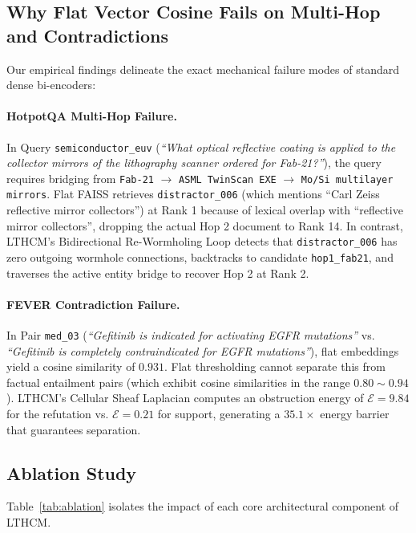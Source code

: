 \documentclass[11pt,a4paper]{article}
\begin{document}
\subsection{Why Flat Vector Cosine Fails on Multi-Hop and Contradictions}

Our empirical findings delineate the exact mechanical failure modes of standard dense bi-encoders:

\paragraph{HotpotQA Multi-Hop Failure.} In Query \texttt{semiconductor\_euv} (\emph{``What optical reflective coating is applied to the collector mirrors of the lithography scanner ordered for Fab-21?''}), the query requires bridging from \texttt{Fab-21} $\to$ \texttt{ASML TwinScan EXE} $\to$ \texttt{Mo/Si multilayer mirrors}. Flat FAISS retrieves \texttt{distractor\_006} (which mentions ``Carl Zeiss reflective mirror collectors'') at Rank 1 because of lexical overlap with ``reflective mirror collectors'', dropping the actual Hop 2 document to Rank 14. In contrast, LTHCM's Bidirectional Re-Wormholing Loop detects that \texttt{distractor\_006} has zero outgoing wormhole connections, backtracks to candidate \texttt{hop1\_fab21}, and traverses the active entity bridge to recover Hop 2 at Rank 2.

\paragraph{FEVER Contradiction Failure.} In Pair \texttt{med\_03} (\emph{``Gefitinib is indicated for activating EGFR mutations''} vs. \emph{``Gefitinib is completely contraindicated for EGFR mutations''}), flat embeddings yield a cosine similarity of $0.931$. Flat thresholding cannot separate this from factual entailment pairs (which exhibit cosine similarities in the range $0.80 \sim 0.94$). LTHCM's Cellular Sheaf Laplacian computes an obstruction energy of $\mathcal{E} = 9.84$ for the refutation vs. $\mathcal{E} = 0.21$ for support, generating a $35.1\times$ energy barrier that guarantees separation.

\subsection{Ablation Study}

Table~\ref{tab:ablation} isolates the impact of each core architectural component of LTHCM.
\end{document}
